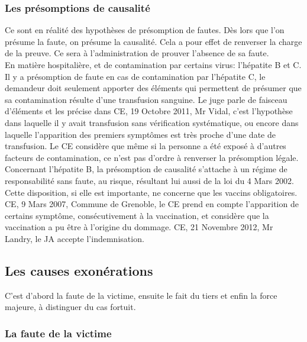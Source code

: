 \documentclass[10pt, a4paper, openany]{book}
\begin{document}
\subsubsection{Les présomptions de causalité}

Ce sont en réalité des hypothèses de présomption de fautes. Dès lors que l'on présume la faute, on présume la causalité. Cela a pour effet de renverser la charge de la preuve. Ce sera à l'administration de prouver l'absence de sa faute. \\
En matière hospitalière, et de contamination par certains virus: l'hépatite B et C. Il y a présomption de faute en cas de contamination par l'hépatite C, le demandeur doit seulement apporter des éléments qui permettent de présumer que sa contamination résulte d'une transfusion sanguine. Le juge parle de faisceau d'éléments et les précise dans CE, 19 Octobre 2011, Mr Vidal, c'est l'hypothèse dans laquelle il y avait transfusion sans vérification systématique, ou encore dans laquelle l'apparition des premiers symptômes est très proche d'une date de transfusion. Le CE considère que même si la personne a été exposé à d'autres facteurs de contamination, ce n'est pas d'ordre à renverser la présomption légale. \\
Concernant l'hépatite B, la présomption de causalité s'attache à un régime de responsabilité sans faute, au risque, résultant lui aussi de la loi du 4 Mars 2002. Cette disposition, si elle est importante, ne concerne que les vaccins obligatoires. CE, 9 Mars 2007, Commune de Grenoble, le CE prend en compte l'apparition de certains symptôme, consécutivement à la vaccination, et considère que la vaccination a pu être à l'origine du dommage. CE, 21 Novembre 2012, Mr Landry, le JA accepte l'indemnisation. 

\subsection{Les causes exonérations}

C'est d'abord la faute de la victime, ensuite le fait du tiers et enfin la force majeure, à distinguer du cas fortuit. 

\subsubsection{La faute de la victime}
\end{document}
